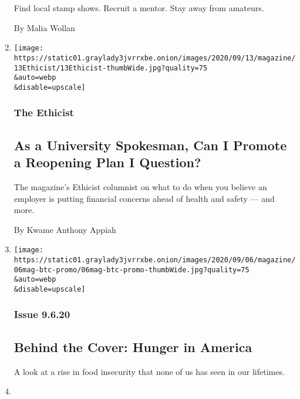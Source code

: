 \begin{enumerate}
  Find local stamp shows. Recruit a mentor. Stay away from amateurs.

  By Malia Wollan
\item
  \href{/2020/09/08/magazine/university-reopening-safety-ethics.html}{}

  \texttt{[image: https://static01.graylady3jvrrxbe.onion/images/2020/09/13/magazine/13Ethicist/13Ethicist-thumbWide.jpg?quality=75\\\&auto=webp\\\&disable=upscale]}

  \hypertarget{the-ethicist-}{%
  \subsubsection{The Ethicist }\label{the-ethicist-}}

  \hypertarget{as-a-university-spokesman-can-i-promote-a-reopening-plan-i-question}{%
  \subsection{As a University Spokesman, Can I Promote a Reopening Plan
  I
  Question?}\label{as-a-university-spokesman-can-i-promote-a-reopening-plan-i-question}}

  The magazine's Ethicist columnist on what to do when you believe an
  employer is putting financial concerns ahead of health and safety ---
  and more.

  By Kwame Anthony Appiah
\item
  \href{/2020/09/04/magazine/behind-the-cover-hunger-in-america.html}{}

  \texttt{[image: https://static01.graylady3jvrrxbe.onion/images/2020/09/06/magazine/06mag-btc-promo/06mag-btc-promo-thumbWide.jpg?quality=75\\\&auto=webp\\\&disable=upscale]}

  \hypertarget{issue-9620}{%
  \subsubsection{Issue 9.6.20}\label{issue-9620}}

  \hypertarget{behind-the-cover-hunger-in-america}{%
  \subsection{Behind the Cover: Hunger in
  America}\label{behind-the-cover-hunger-in-america}}

  A look at a rise in food insecurity that none of us has seen in our
  lifetimes.
\item
  \href{/2020/09/03/magazine/afghan-war-casualty-report-september-2020.html}{}


\end{enumerate}
